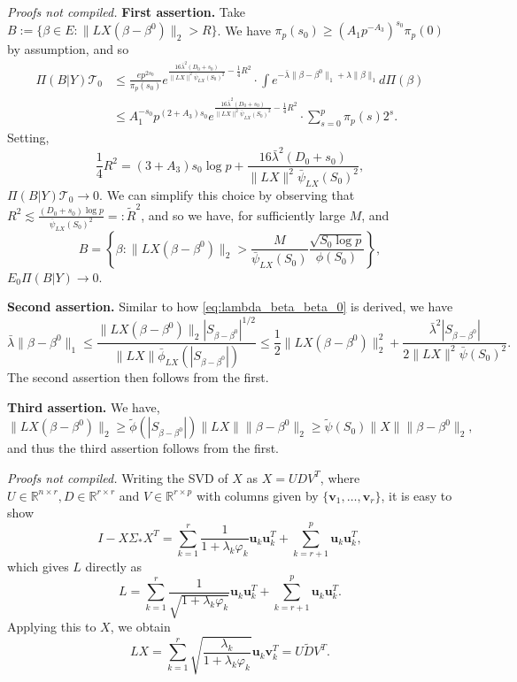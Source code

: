 \documentclass[11pt]{article}
\renewenvironment{proof}[1]{\par\noindent{\bf #1 \ }}{\hfill\BlackBox\\[2mm]}
\renewenvironment{proof}[1]{\textit{Proofs not compiled.}}{}
\newcommand{\R}{\mathbb{R}}
\newcommand{\bezero}{\beta^0}
\newcommand{\postCov}{\Sigma_*}
\begin{document}
\begin{proof}{Proof of Theorem \ref{thm:recovery}.}
{\bf First assertion.} Take $B := \{\beta \in E : \|LX(\beta - \bezero)\|_2  > R\}$. We have $\pi_p(s_0) \geq (A_1 p^{-A_3})^{s_0}\pi_p(0)$ by assumption, and so
\begin{align*}
\Pi(B | Y)\mathcal{T}_0 &\leq \frac{e p^{2s_0}}{\pi_p(s_0)}e^{\frac{16\bar{\lambda}^2(D_0 + s_0)}{\|LX\|^2\bar{\psi}_{LX}(S_0)^2}-\frac{1}{4}R^2} \cdot \int e^{-\bar{\lambda}\|\beta - \bezero\|_1 + \lambda\|\beta\|_1}d\Pi(\beta) \\
&\leq A_1^{-s_0}p^{(2+A_3)s_0}e^{\frac{16\bar{\lambda}^2(D_0 + s_0)}{\|LX\|^2\bar{\psi}_{LX}(S_0)^2}-\frac{1}{4}R^2} \cdot \sum_{s=0}^p \pi_p(s)2^s.
\end{align*}
Setting,
$$
\frac{1}{4}R^2 = (3+A_3)s_0 \log p + \frac{16\bar{\lambda}^2(D_0 + s_0)}{\|LX\|^2\bar{\psi}_{LX}(S_0)^2},
$$
$\Pi(B | Y)\mathcal{T}_0 \rightarrow 0$. We can simplify this choice by observing that $R^2 \lesssim \frac{(D_0 + s_0)\log p}{\bar{\psi}_{LX}(S_0)^2} =: \tilde{R}^2$, and so we have, for sufficiently large $M$, and 
$$B = \left\{\beta : \|LX(\beta - \bezero)\|_2 > \frac{M}{\bar{\psi}_{LX}(S_0)} \frac{\sqrt{S_0 \log p}}{\phi(S_0)} \right\},$$
$E_0 \Pi(B | Y) \rightarrow 0$.

{\bf Second assertion.} Similar to how \eqref{eq:lambda_beta_beta_0} is derived, we have
$$
\bar{\lambda} \|\beta - \bezero\|_1 \leq \frac{\|LX(\beta - \bezero)\|_2|S_{\beta - \bezero}|^{1/2}}{\|LX\| \bar{\phi}_{LX}(|S_{\beta - \bezero}|)} \leq \frac{1}{2}\|LX(\beta - \bezero)\|_2^2 + \frac{\bar{\lambda}^2|S_{\beta - \bezero}|}{2\|LX\|^2 \bar{\psi}(S_0)^2}.
$$
The second assertion then follows from the first.

{\bf Third assertion.} We have,
$$
\|LX(\beta - \bezero)\|_2 \geq \tilde{\phi}(|S_{\beta - \bezero}|)\|LX\|\|\beta - \bezero\|_2 \geq \tilde{\psi}(S_0)\|X\| \|\beta - \bezero\|_2, 
$$
and thus the third assertion follows from the first.
\end{proof}

\begin{proof}{Proof of Lemma \ref{lem:L_and_LX}}
Writing the SVD of $X$ as $X = UDV^T$, where $U \in \R^{n \times r}, D \in \R^{r \times r}$ and $V \in \R^{r \times p}$ with columns given by $\{\mathbf{v}_1, \dots, \mathbf{v}_r\}$, it is easy to show
	$$
	I - X\postCov  X^T = \sum_{k = 1}^r \frac{1}{1+\lambda_k \varphi_k} \mathbf{u}_k \mathbf{u}_k^T + \sum_{k = r + 1}^p \mathbf{u}_k \mathbf{u}_k^T,
	$$
	which gives $L$ directly as
	$$
	L = \sum_{k = 1}^r \frac{1}{\sqrt{1+\lambda_k \varphi_k}} \mathbf{u}_k \mathbf{u}_k^T + \sum_{k = r + 1}^p \mathbf{u}_k \mathbf{u}_k^T.
	$$
	Applying this to $X$, we obtain
	$$
	LX = \sum_{k = 1}^r \sqrt{\frac{\lambda_k}{1+\lambda_k \varphi_k}} \mathbf{u}_k \mathbf{v}_k^T = U \tilde{D} V^T.
	$$
\end{proof}
\end{document}
